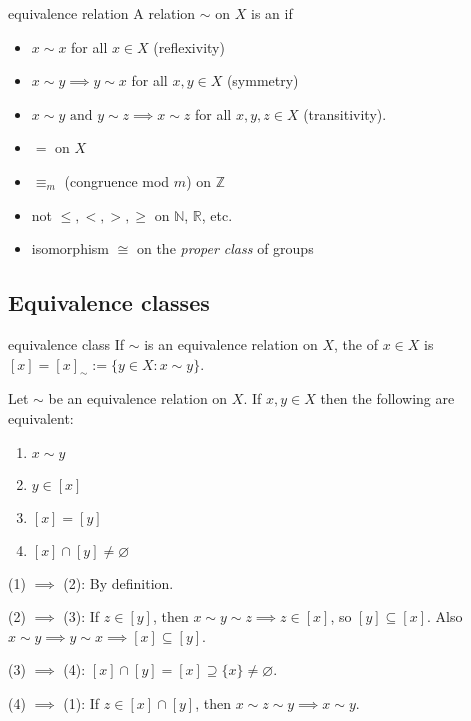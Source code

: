 \documentclass[12pt,letterpaper]{report}
\begin{document}
\begin{defn}{equivalence relation}{}
  A relation $\sim$ on $X$ is an  if
  \begin{itemize}
    \item $x \sim x$ for all $x \in X$ (reflexivity)
    \item $x \sim y \implies y \sim x$ for all $x, y \in X$ (symmetry)
    \item $x \sim y \text{ and } y \sim z \implies x \sim z$ for all $x, y, z \in X$ (transitivity).
  \end{itemize}
\end{defn}

\begin{ex}
  \begin{itemize}
    \item $=$ on $X$
    \item $\equiv_m$ (congruence mod $m$) on $\mathbb{Z}$
    \item not $\leq, <, >, \geq$ on $\mathbb{N}$, $\mathbb{R}$, etc.
    \item isomorphism $\cong$ on the \emph{proper class} of groups
  \end{itemize}
\end{ex}

\pagebreak
\subsection{Equivalence classes}

\begin{defn}{equivalence class}{}
  If $\sim$ is an equivalence relation on $X$, the  of $x \in X$ is
  $[x] = [x]_\sim := \{y \in X : x \sim y\}$.
\end{defn}

\begin{prop}{}{}
  Let $\sim$ be an equivalence relation on $X$.
  If $x, y \in X$ then the following are equivalent:
  \begin{enumerate}
    \item $x \sim y$
    \item $y \in [x]$
    \item $[x] = [y]$
    \item $[x] \cap [y] \neq \varnothing$
  \end{enumerate}
\end{prop}

\begin{thmproof}
  (1) $\implies$ (2): By definition.

  (2) $\implies$ (3): If $z \in [y]$, then $x \sim y \sim z \implies z \in [x]$, so
  $[y] \subseteq [x]$.
  Also $x \sim y \implies y \sim x \implies [x] \subseteq [y]$.

  (3) $\implies$ (4): $[x] \cap [y] = [x] \supseteq \{x\} \neq \varnothing$.

  (4) $\implies$ (1): If $z \in [x] \cap [y]$, then $x \sim z \sim y \implies x \sim y$.
\end{thmproof}
\end{document}
